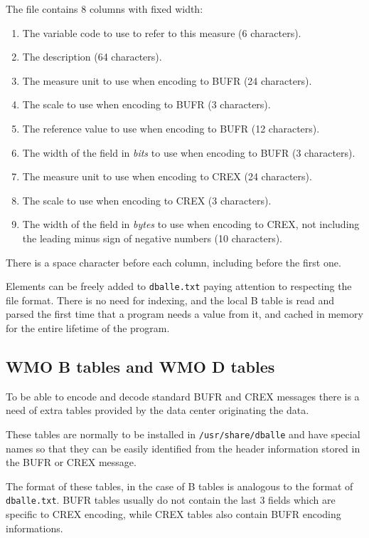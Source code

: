 The file contains 8 columns with fixed width:

\begin{enumerate}
\item The variable code to use to refer to this measure (6 characters).
\item The description (64 characters).
\item The measure unit to use when encoding to BUFR (24 characters).
\item The scale to use when encoding to BUFR (3 characters).
\item The reference value to use when encoding to BUFR (12 characters).
\item The width of the field in \emph{bits} to use when encoding to BUFR (3 characters).
\item The measure unit to use when encoding to CREX (24 characters).
\item The scale to use when encoding to CREX (3 characters).
\item The width of the field in \emph{bytes} to use when encoding to CREX, not
      including the leading minus sign of negative numbers (10 characters).
\end{enumerate}

There is a space character before each column, including before the first one.

Elements can be freely added to {\tt dballe.txt} paying attention to respecting
the file format.  There is no need for indexing, and the local B table is read
and parsed the first time that a program needs a value from it, and cached in
memory for the entire lifetime of the program.

\subsection{WMO B tables and WMO D tables}

To be able to encode and decode standard BUFR and CREX messages there is a need
of extra tables provided by the data center originating the data.

These tables are normally to be installed in {\tt /usr/share/dballe} and have
special names so that they can be easily identified from the header information
stored in the BUFR or CREX message.

The format of these tables, in the case of B tables is analogous to the format
of {\tt dballe.txt}.  BUFR tables usually do not contain the last 3 fields
which are specific to CREX encoding, while CREX tables also contain BUFR
encoding informations.

